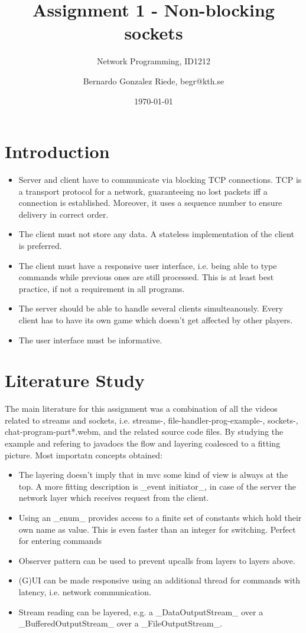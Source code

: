 \documentclass[a4paper]{scrartcl}
\title{Assignment 1 - Non-blocking sockets}
\subtitle{Network Programming, ID1212}
\author{Bernardo Gonzalez Riede, begr@kth.se}
\date{\today}
\begin{document}
\maketitle


\section{Introduction}


\begin{itemize}
    \item Server and client have to communicate via blocking TCP connections.
    TCP is a transport protocol for a network, guaranteeing no lost packets iff a connection is established.
    Moreover, it uses a sequence number to ensure delivery in correct order.
    \item The client must not store any data.
    A stateless implementation of the client is preferred.
    \item The client must have a responsive user interface, i.e. being able to type commands while previous ones are still processed.
    This is at least best practice, if not a requirement in all programs.
    \item The server should be able to handle several clients simulteanously.
    Every client has to have its own game which doesn't get affected by other players.
    \item The user interface must be informative.
\end{itemize}


\section{Literature Study}

The main literature for this assignment was a combination of all the videos related to streams and sockets, i.e. streams-, file-handler-prog-example-,
    sockets-, chat-program-part*.webm, and the related source code files.
By studying the example and refering to javadocs the flow and layering coalesced to a fitting picture.
Most importatn concepts obtained:
\begin{itemize}
    \item The layering doesn't imply that in mvc some kind of view is always at the top.
    A more fitting description is _event initiator_, in case of the server the network layer which receives request from the client.
    \item Using an _enum_ provides access to a finite set of constants which hold their own name as value.
    This is even faster than an integer for switching.
    Perfect for entering commands
    \item Observer pattern can be used to prevent upcalls from layers to layers above.
    \item (G)UI can be made responsive using an additional thread for commands with latency, i.e. network communication.
    \item Stream reading can be layered, e.g. a _DataOutputStream_ over a _BufferedOutputStream_ over a _FileOutputStream_.\end{itemize}
\end{document}
